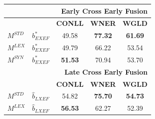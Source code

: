 \begin{table}[t!]
\begin{tabular}{@{}llccc@{}}
	                         &                & \multicolumn{3}{r}{\textbf{Early Cross Early Fusion}} \\ \midrule
	                         &                & \textbf{CONLL} & \textbf{WNER}  &             \textbf{WGLD}             \\
	\cmidrule{3-5}
$M^{\scriptscriptstyle STD}$ & $b^*_{\scriptscriptstyle EXEF}$          & 49.58 & \textbf{77.32} &            \textbf{61.69}             \\
	$M^{\scriptscriptstyle LEX}$                & $b^*_{\scriptscriptstyle EXEF}$      & 49.79 & 66.22 &            53.54             \\
	$M^{\scriptscriptstyle SYN}$                & $b^*_{\scriptscriptstyle EXEF}$           & \textbf{51.53} & 70.94 &            53.70             \\ \midrule
	                         &                & \multicolumn{3}{r}{\textbf{Late Cross Early Fusion}}  \\ \midrule
	                         &                & \textbf{CONLL} & \textbf{WNER}  &             \textbf{WGLD}             \\
	\cmidrule{3-5}
$M^{\scriptscriptstyle STD}$ &$\hat{b}_{\scriptscriptstyle LXEF}$           &  54.82   & \textbf{75.70} &            \textbf{54.73}             \\
	$M^{\scriptscriptstyle LEX}$                & $\hat{b}_{\scriptscriptstyle LXEF}$  & \textbf{56.53} & 62.27 &            52.39             \\ \bottomrule
\end{tabular}
\end{table}
           

